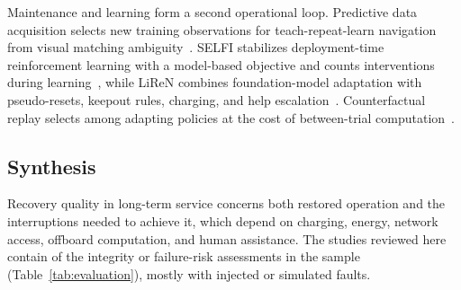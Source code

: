Maintenance and learning form a second operational loop. Predictive data acquisition selects new training observations for teach-repeat-learn navigation from visual matching ambiguity~\cite{P_N06}. SELFI stabilizes deployment-time reinforcement learning with a model-based objective and counts interventions during learning~\cite{P_S14}, while LiReN combines foundation-model adaptation with pseudo-resets, keepout rules, charging, and help escalation~\cite{P_S41}. Counterfactual replay selects among adapting policies at the cost of between-trial computation~\cite{P_S18}.

\subsection{Synthesis}

Recovery quality in long-term service concerns both restored operation and the interruptions needed to achieve it, which depend on charging, energy, network access, offboard computation, and human assistance. The studies reviewed here contain \RelIntegrityCount{} of the \IntegrityCount{} integrity or failure-risk assessments in the sample (Table~\ref{tab:evaluation}), mostly with injected or simulated faults.
